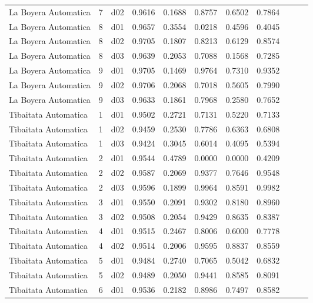 \begin{landscape}
\begin{longtable}{p{5cm}rrrrrrrrrr}
 La Boyera Automatica  & 7 &     d02 &   0.9616 &  0.1688 &    0.8757 &   0.6502 &    0.7864 \\
 La Boyera Automatica  & 8 &     d01 &   0.9657 &  0.3554 &    0.0218 &   0.4596 &    0.4045 \\
 La Boyera Automatica  & 8 &     d02 &   0.9705 &  0.1807 &    0.8213 &   0.6129 &    0.8574 \\
 La Boyera Automatica  & 8 &     d03 &   0.9639 &  0.2053 &    0.7088 &   0.1568 &    0.7285 \\
 La Boyera Automatica  & 9 &     d01 &   0.9705 &  0.1469 &    0.9764 &   0.7310 &    0.9352 \\
 La Boyera Automatica  & 9 &     d02 &   0.9706 &  0.2068 &    0.7018 &   0.5605 &    0.7990 \\
 La Boyera Automatica  & 9 &     d03 &   0.9633 &  0.1861 &    0.7968 &   0.2580 &    0.7652 \\
 Tibaitata Automatica  & 1 &     d01 &   0.9502 &  0.2721 &    0.7131 &   0.5220 &    0.7133 \\
 Tibaitata Automatica  & 1 &     d02 &   0.9459 &  0.2530 &    0.7786 &   0.6363 &    0.6808 \\
 Tibaitata Automatica  & 1 &     d03 &   0.9424 &  0.3045 &    0.6014 &   0.4095 &    0.5394 \\
 Tibaitata Automatica  & 2 &     d01 &   0.9544 &  0.4789 &    0.0000 &   0.0000 &    0.4209 \\
 Tibaitata Automatica  & 2 &     d02 &   0.9587 &  0.2069 &    0.9377 &   0.7646 &    0.9548 \\
 Tibaitata Automatica  & 2 &     d03 &   0.9596 &  0.1899 &    0.9964 &   0.8591 &    0.9982 \\
 Tibaitata Automatica  & 3 &     d01 &   0.9550 &  0.2091 &    0.9302 &   0.8180 &    0.8960 \\
 Tibaitata Automatica  & 3 &     d02 &   0.9508 &  0.2054 &    0.9429 &   0.8635 &    0.8387 \\
 Tibaitata Automatica  & 4 &     d01 &   0.9515 &  0.2467 &    0.8006 &   0.6000 &    0.7778 \\
 Tibaitata Automatica  & 4 &     d02 &   0.9514 &  0.2006 &    0.9595 &   0.8837 &    0.8559 \\
 Tibaitata Automatica  & 5 &     d01 &   0.9484 &  0.2740 &    0.7065 &   0.5042 &    0.6832 \\
 Tibaitata Automatica  & 5 &     d02 &   0.9489 &  0.2050 &    0.9441 &   0.8585 &    0.8091 \\
 Tibaitata Automatica  & 6 &     d01 &   0.9536 &  0.2182 &    0.8986 &   0.7497 &    0.8582 \\

\end{longtable}
\end{landscape}

